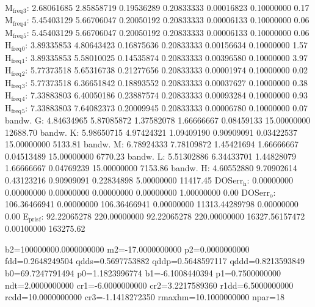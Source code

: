 \documentclass[11pt]{article}
\begin{document}
M\(_{\text{freq}}\)\(_{\text{3}}\):   2.68061685   2.85858719   0.19536289   0.20833333   0.00016823   0.10000000         0.17
M\(_{\text{freq}}\)\(_{\text{4}}\):   5.45403129   5.66706047   0.20050192   0.20833333   0.00006133   0.10000000         0.06
M\(_{\text{freq}}\)\(_{\text{5}}\):   5.45403129   5.66706047   0.20050192   0.20833333   0.00006133   0.10000000         0.06
H\(_{\text{freq}}\)\(_{\text{0}}\):   3.89335853   4.80643423   0.16875636   0.20833333   0.00156634   0.10000000         1.57
H\(_{\text{freq}}\)\(_{\text{1}}\):   3.89335853   5.58010025   0.14535874   0.20833333   0.00396580   0.10000000         3.97
H\(_{\text{freq}}\)\(_{\text{2}}\):   5.77373518   5.65316738   0.21277656   0.20833333   0.00001974   0.10000000         0.02
H\(_{\text{freq}}\)\(_{\text{3}}\):   5.77373518   6.36651842   0.18893552   0.20833333   0.00037627   0.10000000         0.38
H\(_{\text{freq}}\)\(_{\text{4}}\):   7.33883803   6.40050186   0.23887574   0.20833333   0.00093284   0.10000000         0.93
H\(_{\text{freq}}\)\(_{\text{5}}\):   7.33883803   7.64082373   0.20009945   0.20833333   0.00006780   0.10000000         0.07
bandw. G:   4.84634965   5.87085872   1.37582078   1.66666667   0.08459133  15.00000000     12688.70
bandw. K:   5.98650715   4.97424321   1.09409190   0.90909091   0.03422537  15.00000000      5133.81
bandw. M:   6.78924333   7.78109872   1.45421694   1.66666667   0.04513489  15.00000000      6770.23
bandw. L:   5.51302886   6.34433701   1.44828079   1.66666667   0.04769239  15.00000000      7153.86
bandw. H:   4.60552880   9.70902614   0.43123216   0.90909091   0.22834898   5.00000000     11417.45
DOSerr\(_{\text{h}}\):   0.00000000   0.00000000   0.00000000   0.00000000   0.00000000   1.00000000         0.00
DOSerr\(_{\text{o}}\): 106.36466941   0.00000000 106.36466941   0.00000000 11313.44289798   0.00000000         0.00
E\(_{\text{pris}}\)\(_{\text{f}}\):  92.22065278 220.00000000  92.22065278 220.00000000 16327.56157472   0.00100000    163275.62

b2=100000000.0000000000 m2=-17.0000000000 p2=0.0000000000 fdd=0.2648249504 qdds=0.5697753882 qddp=0.5648597117 qddd=0.8213593849 b0=69.7247791494 p0=1.1823996774 b1=-6.1008440394 p1=0.7500000000 ndt=2.0000000000 cr1=-6.0000000000 cr2=3.2217589360 r1dd=6.5000000000 rcdd=10.0000000000 cr3=-1.1418272350 rmaxhm=10.1000000000 npar=18 
\end{document}
